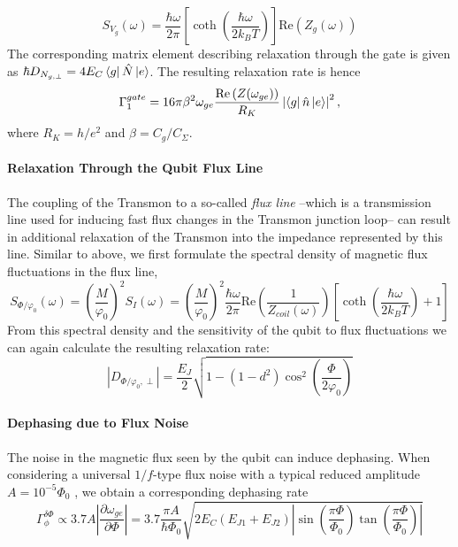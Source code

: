 %
\begin{equation}
S_{V_g}(\omega) = \frac{\hbar\omega}{2\pi}\left[\coth{\left(\frac{\hbar \omega}{2 k_B T}\right)}\right]\mathrm{Re}\left(Z_g(\omega)\right)
\end{equation}
%
The corresponding matrix element describing relaxation through the gate is given as $\hbar D_{N_{g,\perp}}=4 E_C\left< g \right|\hat{N}\left| e \right>$. The resulting relaxation rate is hence
%
\begin{equation}
\Gamma_1^{gate} = 16\pi\beta^2 \omega_{ge} \frac{\mathrm{Re}\left(Z(\omega_{ge})\right)}{R_K}\left|\left< g \right|\hat{n}\left| e \right>\right|^2,
\end{equation}
%
where $R_K = h/e^2$ and $\beta=C_g/C_\Sigma$.

\paragraph{Relaxation Through the Qubit Flux Line}

The coupling of the Transmon to a so-called {\it flux line} --which is a transmission line used for inducing fast flux changes in the Transmon junction loop-- can result in additional relaxation of the Transmon into the impedance represented by this line. Similar to above, we first formulate the spectral density of magnetic flux fluctuations in the flux line,
%
\begin{equation}
S_{\Phi/\varphi_0}(\omega) = \left(\frac{M}{\varphi_0}\right)^2 S_I(\omega) = \left(\frac{M}{\varphi_0}\right)^2\frac{\hbar\omega}{2\pi}\mathrm{Re}\left(\frac{1}{Z_{coil}(\omega)}\right)\left[\coth{\left(\frac{\hbar\omega}{2k_B T}\right)}+1\right]
\end{equation}
%
From this spectral density and the sensitivity of the qubit to flux fluctuations we can again calculate the resulting relaxation rate:
%
\begin{equation}
\left|D_{\Phi/\varphi_0,\perp}\right|  = \frac{E_J}{2}\sqrt{1-(1-d^2)\cos^2{\left(\frac{\Phi}{2\varphi_0}\right)}}
\end{equation}
%
\paragraph{Dephasing due to Flux Noise}
The noise in the magnetic flux seen by the qubit can induce dephasing. When considering a universal $1/f$-type flux noise with a typical reduced amplitude $A=10^{-5}\Phi_0$ \citep{koch_charge-insensitive_2007}, we obtain a corresponding dephasing rate
%
\begin{equation}
\Gamma_\phi^{\delta \Phi} \propto 3.7A\left|\frac{\partial \omega_{ge}}{\partial \Phi}\right| = 3.7\frac{\pi A}{\hbar \Phi_0}\sqrt{2E_C(E_{J1}+E_{J2})\left|\sin{\left(\frac{\pi\Phi}{\Phi_0}\right)}\tan{\left(\frac{\pi\Phi}{\Phi_0}\right)}\right|}
\end{equation}
%

